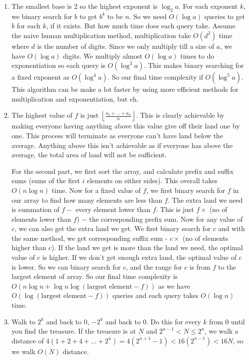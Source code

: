\documentclass[12pt]{report}
\begin{document}
\begin{enumerate}[label=\textbf{\arabic*.}]
    \item The smallest base is $2$ so the highest exponent is $\log_2 a$. For each exponent $k$, we binary search for $b$
    to get $b^k$ to be $n$. So we need $O(\log a)$ queries to get $b$ for each $k$, if it exists. But how much time
    does each query take. Assume the naive human multiplication method, multiplication take $O(d^2)$ time where $d$
    is the number of digits. Since we only multiply till a size of $a$, we have $O(\log a)$ digits. We multiply
    almost $O(\log a)$ times to do exponentiation so each query is $O(\log^3 a)$. This makes binary searching for a 
    fixed exponent as $O(\log^4 a)$. So our final time complexity if $O(\log^5 a)$. This algorithm can be make a lot 
    faster by using more efficient methods for multiplication and exponentiation, but eh.

    \item The highest value of $f$ is just $\left \lfloor \frac{a_1 + \dots + a_n}{n} \right \rfloor$. This is clearly
    achievable by making everyone having anything above this value give off their land one by one. This process will 
    terminate as everyone can't have land below the average. Anything above this isn't achievable as if everyone has 
    above the average, the total area of land will not be sufficient.

    For the second part, we first sort the array, and calculate prefix and suffix sums (sums of the first $i$ elements
    on either sides). This overall takes $O(n \log n)$ time. Now for a fixed value of $f$, we first binary search for 
    $f$ in our array to find how many elements are less than $f$. The extra land we need is summation of $f - $ every
    element lower than $f$. This is just $f \times$ (no of elements lower than $f$) $-$ the corresponding prefix sum.
    Now for any value of $c$, we can also get the extra land we get. We first binary search for $c$ and with the same 
    method, we get corresponding suffix sum - $c \times$ (no of elements higher than $c$). If the land we get is more 
    than the land we need, the optimal value of $c$ is higher. If we don't get enough extra land, the optimal value of 
    $c$ is lower. So we can binary search for $c$, and the range for $c$ is from $f$ to the largest element of array.
    So our final time complexity is $O(n \log n + \log n \log (\text{largest element} - f))$ as we have 
    $ O(\log (\text{largest element} - f))$ queries and each query takes $O(\log n)$ time.

    \item Walk to $2^k$ and back to $0$, $-2^k$ and back to $0$. Do this for every $k$ from $0$ until you find the
    treasure. If the treasure is at $N$ and $2^{n-1} < N \leq 2^n$, we walk a distance of $4(1+2+4+\dots+2^n) = 
    4(2^{n+1} -1) < 16(2^{n-1}) < 16N$, so we walk $O(N)$ distance.
\end{enumerate}
\end{document}
